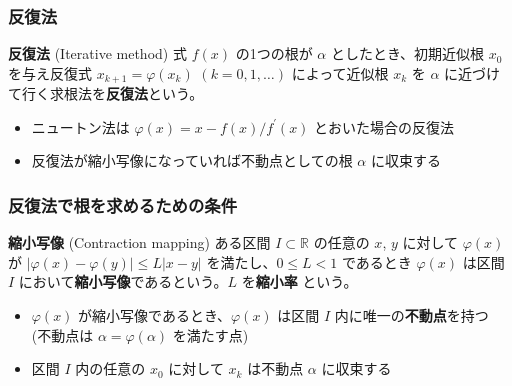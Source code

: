 \documentclass[dvipdfmx,aspectratio=169,20pt]{beamer}
\newcommand{\myfontsetting}[3]{{\fontsize{#1}{#2}\selectfont #3}}
\begin{document}
\begin{frame}
\frametitle{反復法}
\begin{block}{{\bf 反復法} {\small (Iterative method)}}
{\small 
式 $f(x)$ の1つの根が $\alpha$ としたとき、初期近似根 $x_0$ を与え反復式 $x_{k+1} = \varphi(x_k)$ $(k=0,1,\dots)$ によって近似根 $x_k$ を $\alpha$ に近づけて行く求根法を{\bf 反復法}という。}
\end{block}
\begin{itemize}
    \item \myfontsetting{14pt}{16pt}{ニュートン法は $\varphi(x)=x - f(x)/f^\prime(x)$ とおいた場合の反復法}
     \item 
    \myfontsetting{14pt}{16pt}{反復法が縮小写像になっていれば不動点としての根 $\alpha$ に収束する}
\end{itemize}
\end{frame}
\begin{frame}
\frametitle{\large 反復法で根を求めるための条件}
\begin{block}{{\bf 縮小写像} {\small (Contraction mapping)}}
\myfontsetting{14pt}{16pt}{ある区間 $I\subset \mathbb{R}$ の任意の $x$, $y$ に対して $\varphi(x)$ が $|\varphi(x)-\varphi(y)|\le L|x-y|$ を満たし、$0\le L < 1$ であるとき $\varphi(x)$ は区間 $I$ において{\bf 縮小写像}であるという。$L$ を{\bf 縮小率} という。}
\end{block}
\begin{itemize}
    \item \myfontsetting{14pt}{16pt}{$\varphi(x)$ が縮小写像であるとき、$\varphi(x)$ は区間 $I$ 内に唯一の{\bf 不動点}を持つ}
        \myfontsetting{14pt}{16pt}{(不動点は $\alpha = \varphi(\alpha)$ を満たす点)}
    \item \myfontsetting{14pt}{16pt}{区間 $I$ 内の任意の $x_0$ に対して $x_k$ は不動点 $\alpha$ に収束する
    }
\end{itemize}
\end{frame}
\end{document}
